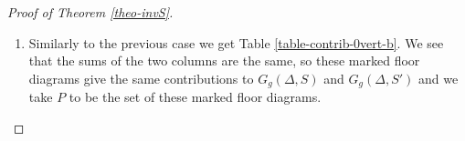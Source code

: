 \begin{proof}[Proof of Theorem \ref{theo-invS}]
\begin{enumerate}[label=(\alph*)]
\begin{table}[ht]
\renewcommand{\arraystretch}{1.5}
\centering
\[ 
\begin{array}{|c||c|c|}
\hline
  & S  & S' \\
\hline
\hline
(i,i+1,i+2) & \dfrac{[\omega_1][\omega_2][\omega_1 + \omega_2]}{[2]} [\omega_3]^2 & \dfrac{[\omega_2][\omega_3][\omega_2 + \omega_3]}{[2]} [\omega_1]^2  \\
\hline 
(i,i+2,i+1) & \dfrac{[\omega_1][\omega_3][\omega_1 + \omega_3]}{[2]} [\omega_2]^2 & \dfrac{[\omega_2][\omega_3][\omega_2 + \omega_3]}{[2]} [\omega_1]^2   \\
\hline 
(i+1,i,i+2) & \dfrac{[\omega_1][\omega_2][\omega_1 + \omega_2]}{[2]} [\omega_3]^2 & \dfrac{[\omega_1][\omega_3][\omega_1 + \omega_3]}{[2]} [\omega_2]^2    \\
\hline 
(i+1,i+2,i) & \dfrac{[\omega_1][\omega_3][\omega_1 + \omega_3]}{[2]} [\omega_2]^2 & \dfrac{[\omega_1][\omega_2][\omega_1 + \omega_2]}{[2]} [\omega_3]^2   \\
\hline 
(i+2,i,i+1) & \dfrac{[\omega_2][\omega_3][\omega_2 + \omega_3]}{[2]} [\omega_1]^2 & \dfrac{[\omega_1][\omega_3][\omega_1 + \omega_3]}{[2]} [\omega_2]^2   \\
\hline 
(i+2,i+1,i) & \dfrac{[\omega_2][\omega_3][\omega_2 + \omega_3]}{[2]} [\omega_1]^2 & \dfrac{[\omega_1][\omega_2][\omega_1 + \omega_2]}{[2]} [\omega_3]^2    \\
\hline 
\end{array} \]
\caption{Contribution of the markings in case (a).}
\label{table-contrib-0vert-a}
\end{table}


 Note that depending on the unshown part of the diagram and on the precise value of the weights, some markings may give isomorphic marked diagrams: there may be only 3 or 1 marked floor diagrams instead of 6. However, in that case some of the weights among $\omega_1$, $\omega_2$ and $\omega_3$ are equal, and removing the superfluous rows if the table does not affect the equality of the sums of the columns.


\item Similarly to the previous case we get Table \ref{table-contrib-0vert-b}. We see that the sums of the two columns are the same, so these marked floor diagrams give the same contributions to $G_g(\Delta,S)$ and $G_g(\Delta,S')$ and we take $P$ to be the set of these marked floor diagrams.


\end{enumerate}
\end{proof}
